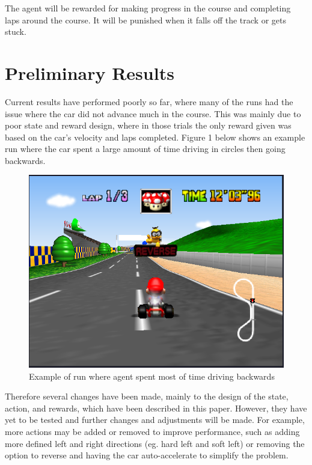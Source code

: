 \documentclass[10pt,twocolumn,letterpaper]{article}
\begin{document}
The agent will be rewarded for making progress in the course and completing laps around the course. It will be punished when it falls off the track or gets stuck. 


\section{Preliminary Results}
Current results have performed poorly so far, where many of the runs had the issue where the car did not advance much in the course. This was mainly due to poor state and reward design, where in those trials the only reward given was based on the car's velocity and laps completed. Figure 1 below shows an example run where the car spent a large amount of time driving in circles then going backwards.

\begin{figure}[t]
  \centering
   \includegraphics[width=0.8\linewidth]{images/demo.png}

   \caption{Example of run where agent spent most of time driving backwards}
   \label{fig:onecol}
\end{figure}

Therefore several changes have been made, mainly to the design of the state, action, and rewards, which have been described in this paper. However, they have yet to be tested and further changes and adjustments will be made. For example, more actions may be added or removed to improve performance, such as adding more defined left and right directions (eg. hard left and soft left) or removing the option to reverse and having the car auto-accelerate to simplify the problem. 

{\small


}
\end{document}
